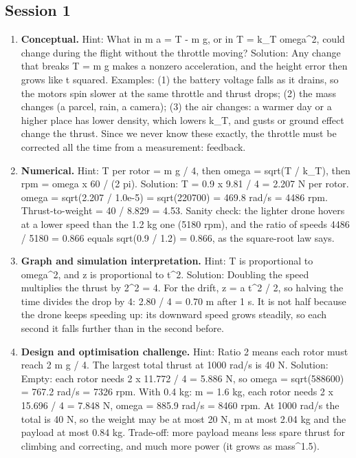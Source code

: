 \documentclass[11pt,a4paper]{article}
\begin{document}
\subsection*{Session 1}
\begin{enumerate}[nosep]
\item \textbf{Conceptual.} Hint: What in m a = T - m g, or in T = k\_T omega\textasciicircum{}2, could change during the flight without the throttle moving? Solution: Any change that breaks T = m g makes a nonzero acceleration, and the height error then grows like t squared. Examples: (1) the battery voltage falls as it drains, so the motors spin slower at the same throttle and thrust drops; (2) the mass changes (a parcel, rain, a camera); (3) the air changes: a warmer day or a higher place has lower density, which lowers k\_T, and gusts or ground effect change the thrust. Since we never know these exactly, the throttle must be corrected all the time from a measurement: feedback.
\item \textbf{Numerical.} Hint: T per rotor = m g / 4, then omega = sqrt(T / k\_T), then rpm = omega x 60 / (2 pi). Solution: T = 0.9 x 9.81 / 4 = 2.207 N per rotor. omega = sqrt(2.207 / 1.0e-5) = sqrt(220700) = 469.8 rad/s = 4486 rpm. Thrust-to-weight = 40 / 8.829 = 4.53. Sanity check: the lighter drone hovers at a lower speed than the 1.2 kg one (5180 rpm), and the ratio of speeds 4486 / 5180 = 0.866 equals sqrt(0.9 / 1.2) = 0.866, as the square-root law says.
\item \textbf{Graph and simulation interpretation.} Hint: T is proportional to omega\textasciicircum{}2, and z is proportional to t\textasciicircum{}2. Solution: Doubling the speed multiplies the thrust by 2\textasciicircum{}2 = 4. For the drift, z = a t\textasciicircum{}2 / 2, so halving the time divides the drop by 4: 2.80 / 4 = 0.70 m after 1 s. It is not half because the drone keeps speeding up: its downward speed grows steadily, so each second it falls further than in the second before.
\item \textbf{Design and optimisation challenge.} Hint: Ratio 2 means each rotor must reach 2 m g / 4. The largest total thrust at 1000 rad/s is 40 N. Solution: Empty: each rotor needs 2 x 11.772 / 4 = 5.886 N, so omega = sqrt(588600) = 767.2 rad/s = 7326 rpm. With 0.4 kg: m = 1.6 kg, each rotor needs 2 x 15.696 / 4 = 7.848 N, omega = 885.9 rad/s = 8460 rpm. At 1000 rad/s the total is 40 N, so the weight may be at most 20 N, m at most 2.04 kg and the payload at most 0.84 kg. Trade-off: more payload means less spare thrust for climbing and correcting, and much more power (it grows as mass\textasciicircum{}1.5).
\end{enumerate}
\end{document}
